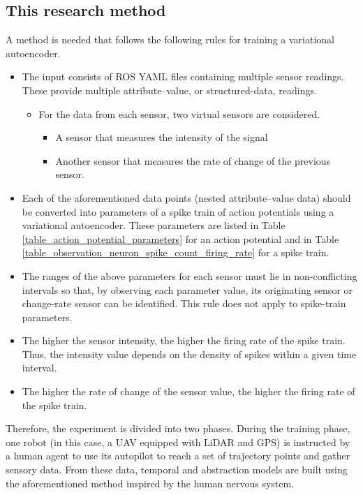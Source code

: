 \documentclass[a4paper]{article}
\begin{document}
      \subsection{This research method}
         A method is needed that follows the following rules for training a variational autoencoder.

         \begin{itemize}
            \item The input consists of ROS YAML files containing multiple sensor readings. These provide multiple attribute--value, or structured-data, readings.
            \begin{itemize}
               \item For the data from each sensor, two virtual sensors are considered.
               \begin{itemize}
                  \item A sensor that measures the intensity of the signal
                  \item Another sensor that measures the rate of change of the previous sensor.
               \end{itemize}
            \end{itemize}
            \item Each of the aforementioned data points (nested attribute--value data) should be converted into parameters of a spike train of action potentials using a variational autoencoder. These parameters are listed in Table \ref{table_action_potential_parameters} for an action potential and in Table \ref{table_observation_neuron_spike_count_firing_rate} for a spike train.
            \item The ranges of the above parameters for each sensor must lie in non-conflicting intervals so that, by observing each parameter value, its originating sensor or change-rate sensor can be identified. This rule does not apply to spike-train parameters.
            \item The higher the sensor intensity, the higher the firing rate of the spike train. Thus, the intensity value depends on the density of spikes within a given time interval.
            \item The higher the rate of change of the sensor value, the higher the firing rate of the spike train.

         \end{itemize}

         Therefore, the experiment is divided into two phases. During the training phase, one robot (in this case, a UAV equipped with LiDAR and GPS) is instructed by a human agent to use its autopilot to reach a set of trajectory points and gather sensory data. From these data, temporal and abstraction models are built using the aforementioned method inspired by the human nervous system.
\end{document}
